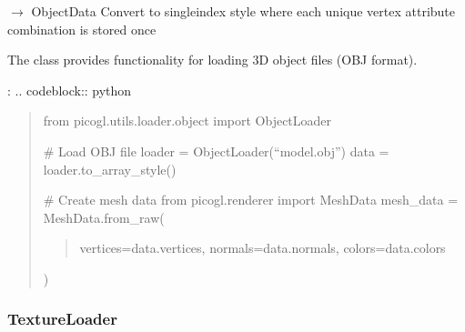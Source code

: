 \documentclass[a4paper,10pt,english,openany,oneside]{sphinxmanual}
\begin{document}
\begin{fulllineitems}
\begin{fulllineitems}
\end{fulllineitems}


\begin{fulllineitems}
\label{\detokenize{api/utils:picogl.utils.loader.object.ObjectLoader.to_single_index_style}}
\pysigstartsignatures
\pysiglinewithargsret
{}
{}
{{ $\rightarrow$ ObjectData}}
\pysigstopsignatures
\sphinxAtStartPar
Convert to single\sphinxhyphen{}index style where each unique vertex attribute combination is stored once

\end{fulllineitems}


\end{fulllineitems}


\sphinxAtStartPar
The  class provides functionality for loading 3D object files (OBJ format).

\sphinxAtStartPar
{}:
.. code\sphinxhyphen{}block:: python
\begin{quote}

\sphinxAtStartPar
from picogl.utils.loader.object import ObjectLoader

\sphinxAtStartPar
\# Load OBJ file
loader = ObjectLoader(“model.obj”)
data = loader.to\_array\_style()

\sphinxAtStartPar
\# Create mesh data
from picogl.renderer import MeshData
mesh\_data = MeshData.from\_raw(
\begin{quote}

\sphinxAtStartPar
vertices=data.vertices,
normals=data.normals,
colors=data.colors
\end{quote}

\sphinxAtStartPar
)
\end{quote}


\subsubsection{TextureLoader}
\label{\detokenize{api/utils:textureloader}}
\end{document}
